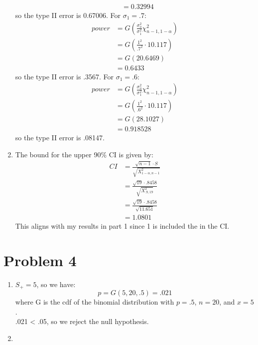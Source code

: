 \documentclass{article}
\begin{document}
\begin{enumerate}
\begin{align*}
&= 0.32994
\end{align*}
so the type II error is 0.67006. For $\sigma_1 = .7$: \\
\begin{align*}
power &= G(\frac{\sigma_o^2}{\sigma_1^2}\chi^2_{n - 1, 1 - \alpha}) \\
&= G(\frac{1^2}{.7^2}\cdot 10.117) \\
&= G(20.6469) \\
&= 0.6433
\end{align*}
so the type II error is .3567. For $\sigma_1 = .6$: \\
\begin{align*}
power &= G(\frac{\sigma_o^2}{\sigma_1^2}\chi^2_{n - 1, 1 - \alpha}) \\
&= G(\frac{1^2}{.6^2}\cdot 10.117) \\
&= G(28.1027) \\
&= 0.918528
\end{align*}
so the type II error is .08147. \\
\item The bound for the upper 90\% CI is given by: \\
\begin{align*}
CI &= \frac{\sqrt{n - 1} \cdot S}{\sqrt{X^2_{1 - \alpha, n - 1}}} \\
&= \frac{\sqrt{19} \cdot .8458}{\sqrt{X^2_{.9, 19}}} \\
&= \frac{\sqrt{19} \cdot .8458}{\sqrt{11.651}} \\
&= 1.0801
\end{align*}
This aligns with my results in part 1 since 1 is included the in the CI. 
\end{enumerate}
\section*{Problem 4}
\begin{enumerate}
\item $S_+ = 5$, so we have: \\
\[
p = G(5, 20, .5) = .021
\]
where G is the cdf of the binomial distribution with $p = .5$, $n = 20$, and $x = 5$. \\
.021 < .05, so we reject the null hypothesis. \\
\item 
\end{enumerate}
\end{document}
